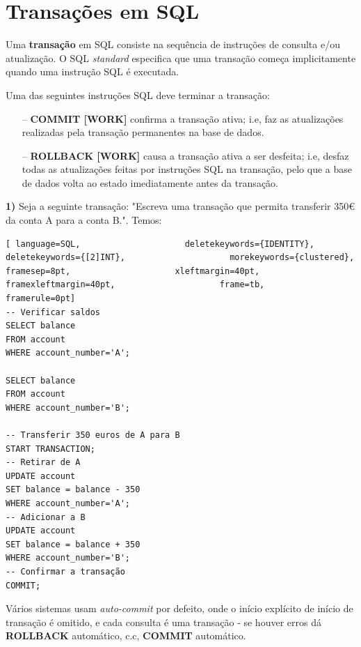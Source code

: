 \documentclass[oneside]{book}
\theoremstyle{definition}
\begin{document}
\section{Transações em SQL}
Uma \textbf{transação} em SQL consiste na sequência de instruções de consulta e/ou atualização. O SQL \textit{standard} especifica que uma transação começa implicitamente quando uma instrução SQL é executada.

Uma das seguintes instruções SQL deve terminar a transação:
\begin{itemize}
    \itemsep0cm
    \item[--] \textbf{COMMIT [WORK]} confirma a transação ativa; i.e, faz as atualizações realizadas pela transação permanentes na base de dados.
    \item[--] \textbf{ROLLBACK [WORK]} causa a transação ativa a ser desfeita; i.e, desfaz todas as atualizações feitas por instruções SQL na transação, pelo que a base de dados volta ao estado imediatamente antes da transação.
\end{itemize}

\textbf{1)} Seja a seguinte transação: "Escreva uma transação que permita transferir 350€ da conta A para a conta B.". Temos:
\begin{lstlisting}[ language=SQL,                     deletekeywords={IDENTITY},                     deletekeywords={[2]INT},                     morekeywords={clustered},                     framesep=8pt,                     xleftmargin=40pt,                     framexleftmargin=40pt,                     frame=tb,                     framerule=0pt]
-- Verificar saldos
SELECT balance
FROM account
WHERE account_number='A';

SELECT balance
FROM account
WHERE account_number='B';

-- Transferir 350 euros de A para B
START TRANSACTION;
-- Retirar de A
UPDATE account
SET balance = balance - 350
WHERE account_number='A';
-- Adicionar a B
UPDATE account
SET balance = balance + 350
WHERE account_number='B';
-- Confirmar a transação
COMMIT;
\end{lstlisting}

Vários sistemas usam \textit{auto-commit} por defeito, onde o início explícito de início de transação é omitido, e cada consulta é uma transação - se houver erros dá \textbf{ROLLBACK} automático, c.c, \textbf{COMMIT} automático.
\end{document}
